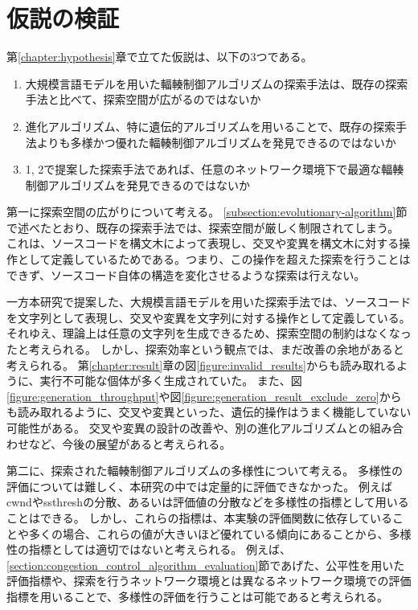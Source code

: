 \documentclass[a4paper,11pt]{jreport}
\newcommand{\figref}[1]{図\ref{#1}}
\newcommand{\chapref}[1]{第\ref{#1}章}
\newcommand{\secref}[1]{\ref{#1}節}
\begin{document}
\section{仮説の検証}

\chapref{chapter:hypothesis}で立てた仮説は、以下の3つである。
\begin{enumerate}
  \item 大規模言語モデルを用いた輻輳制御アルゴリズムの探索手法は、既存の探索手法と比べて、探索空間が広がるのではないか
  \item 進化アルゴリズム、特に遺伝的アルゴリズムを用いることで、既存の探索手法よりも多様かつ優れた輻輳制御アルゴリズムを発見できるのではないか
  \item 1, 2で提案した探索手法であれば、任意のネットワーク環境下で最適な輻輳制御アルゴリズムを発見できるのではないか
\end{enumerate}
第一に探索空間の広がりについて考える。
\secref{subsection:evolutionary-algorithm}で述べたとおり、既存の探索手法では、探索空間が厳しく制限されてしまう。
これは、ソースコードを構文木によって表現し、交叉や変異を構文木に対する操作として定義しているためである。つまり、この操作を超えた探索を行うことはできず、ソースコード自体の構造を変化させるような探索は行えない。

一方本研究で提案した、大規模言語モデルを用いた探索手法では、ソースコードを文字列として表現し、交叉や変異を文字列に対する操作として定義している。
それゆえ、理論上は任意の文字列を生成できるため、探索空間の制約はなくなったと考えられる。
しかし、探索効率という観点では、まだ改善の余地があると考えられる。
\chapref{chapter:result}の\figref{figure:invalid_results}からも読み取れるように、実行不可能な個体が多く生成されていた。
また、\figref{figure:generation_throughput}や\figref{figure:generation_result_exclude_zero}からも読み取れるように、交叉や変異といった、遺伝的操作はうまく機能していない可能性がある。
交叉や変異の設計の改善や、別の進化アルゴリズムとの組み合わせなど、今後の展望があると考えられる。

第二に、探索された輻輳制御アルゴリズムの多様性について考える。
多様性の評価については難しく、本研究の中では定量的に評価できなかった。
例えばcwndやssthreshの分散、あるいは評価値の分散などを多様性の指標として用いることはできる。
しかし、これらの指標は、本実験の評価関数に依存していることや多くの場合、これらの値が大きいほど優れている傾向にあることから、多様性の指標としては適切ではないと考えられる。
例えば、\secref{section:congestion_control_algorithm_evaluation}であげた、公平性を用いた評価指標や、探索を行うネットワーク環境とは異なるネットワーク環境での評価指標を用いることで、多様性の評価を行うことは可能であると考えられる。
\end{document}
